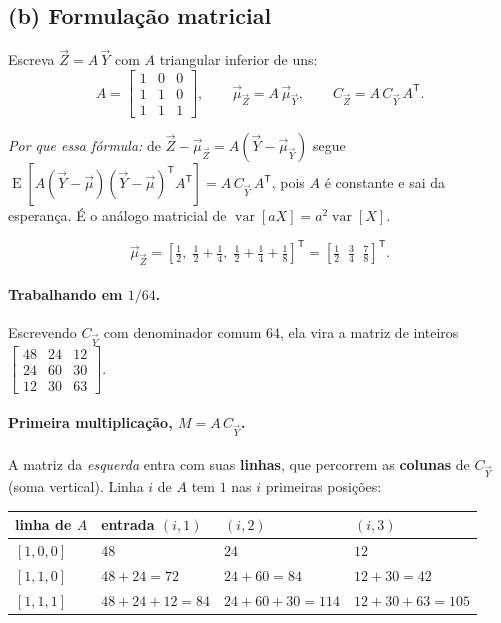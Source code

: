 \documentclass[11pt,a4paper]{article}
\DeclareMathOperator{\E}{E}
\DeclareMathOperator{\var}{var}
\begin{document}
\subsection*{(b) Formulação matricial}

Escreva $\vec Z=A\,\vec Y$ com $A$ triangular inferior de uns:
\[
A=\begin{bmatrix}1&0&0\\1&1&0\\1&1&1\end{bmatrix},
\qquad
\vec\mu_{\vec Z}=A\,\vec\mu_{\vec Y},
\qquad
C_{\vec Z}=A\,C_{\vec Y}\,A^{\mathsf T}.
\]

\emph{Por que essa fórmula:} de $\vec Z-\vec\mu_{\vec Z}=A(\vec Y-\vec\mu_{\vec Y})$
segue
$\E\!\left[A(\vec Y-\vec\mu)(\vec Y-\vec\mu)^{\mathsf T}A^{\mathsf T}\right]
= A\,C_{\vec Y}\,A^{\mathsf T}$, pois $A$ é constante e sai da esperança. É o
análogo matricial de $\var[aX]=a^2\var[X]$.

\[
\vec\mu_{\vec Z}=\left[\tfrac12,\;\tfrac12+\tfrac14,\;\tfrac12+\tfrac14+\tfrac18\right]^{\mathsf T}
=\left[\tfrac12\;\;\tfrac34\;\;\tfrac78\right]^{\mathsf T}.
\]

\paragraph{Trabalhando em $1/64$.} Escrevendo $C_{\vec Y}$ com denominador comum
$64$, ela vira a matriz de inteiros $\begin{bmatrix}48&24&12\\24&60&30\\12&30&63\end{bmatrix}$.

\paragraph{Primeira multiplicação, $M=A\,C_{\vec Y}$.} A matriz da \emph{esquerda}
entra com suas \textbf{linhas}, que percorrem as \textbf{colunas} de $C_{\vec Y}$
(soma vertical). Linha $i$ de $A$ tem $1$ nas $i$ primeiras posições:

\begin{center}
\begin{tabular}{llll}
\toprule
linha de $A$ & entrada $(i,1)$ & $(i,2)$ & $(i,3)$ \\
\midrule
$[1,0,0]$ & $48$ & $24$ & $12$ \\
$[1,1,0]$ & $48{+}24=72$ & $24{+}60=84$ & $12{+}30=42$ \\
$[1,1,1]$ & $48{+}24{+}12=84$ & $24{+}60{+}30=114$ & $12{+}30{+}63=105$ \\
\bottomrule
\end{tabular}
\end{center}
\end{document}
